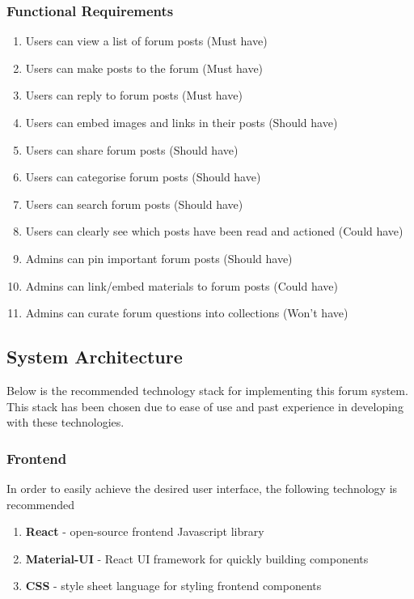 \subsubsection{Functional Requirements}
\begin{enumerate}
    \item Users can view a list of forum posts (Must have)
    \item Users can make posts to the forum (Must have)
    \item Users can reply to forum posts (Must have)
    \item Users can embed images and links in their posts (Should have)
    \item Users can share forum posts (Should have)
    \item Users can categorise forum posts (Should have)
    \item Users can search forum posts (Should have)
    \item Users can clearly see which posts have been read and actioned (Could have)
    \item Admins can pin important forum posts (Should have)
    \item Admins can link/embed materials to forum posts (Could have)
    \item Admins can curate forum questions into collections (Won't have)
\end{enumerate}

\subsection{System Architecture}
Below is the recommended technology stack for implementing this forum system.
This stack has been chosen due to ease of use and past experience in developing with these technologies.

\subsubsection{Frontend}
In order to easily achieve the desired user interface, the following technology is recommended

\begin{enumerate}
    \item \textbf{React} - open-source frontend Javascript library
    \item \textbf{Material-UI} - React UI framework for quickly building components
    \item \textbf{CSS} - style sheet language for styling frontend components
\end{enumerate}

